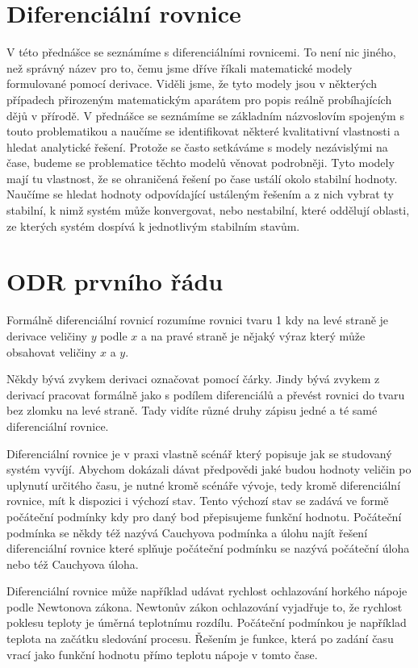 \documentclass[12pt]{article}
\begin{document}
\section*{Diferenciální rovnice}

V této přednášce se seznámíme s diferenciálními rovnicemi. To není nic jiného, než správný název pro to, čemu jsme dříve říkali matematické modely formulované pomocí derivace. Viděli jsme, že tyto modely jsou v některých případech přirozeným matematickým aparátem pro popis reálně probíhajících dějů v přírodě. V přednášce se seznámíme se základním názvoslovím spojeným s touto problematikou a naučíme se identifikovat některé kvalitativní vlastnosti a hledat analytické řešení. Protože se často setkáváme s modely nezávislými na čase, budeme se problematice těchto modelů věnovat podrobněji. Tyto modely mají tu vlastnost, že se ohraničená řešení po čase ustálí okolo stabilní hodnoty. Naučíme se hledat hodnoty odpovídající ustáleným řešením a z nich vybrat ty stabilní, k nimž systém může konvergovat, nebo nestabilní, které oddělují oblasti, ze kterých systém dospívá k jednotlivým stabilním stavům.

\section*{ODR prvního řádu}

Formálně diferenciální rovnicí rozumíme rovnici tvaru 1 kdy na levé straně je derivace veličiny $y$ podle $x$ a na pravé straně je nějaký výraz který může obsahovat veličiny $x$ a $y$. 

Někdy bývá zvykem derivaci označovat pomocí čárky. Jindy bývá zvykem z derivací pracovat formálně jako s podílem diferenciálů a převést rovnici do tvaru bez zlomku na levé straně. Tady vidíte různé druhy zápisu jedné a té samé diferenciální rovnice.

Diferenciální rovnice je v praxi vlastně scénář který popisuje jak se studovaný systém vyvíjí. Abychom dokázali dávat předpovědi jaké budou hodnoty veličin po uplynutí určitého času, je nutné kromě scénáře vývoje, tedy kromě diferenciální rovnice, mít k dispozici i výchozí stav. Tento výchozí stav se zadává ve formě počáteční podmínky kdy pro daný bod přepisujeme funkční hodnotu. Počáteční podmínka se někdy též nazývá Cauchyova podmínka a úlohu najít řešení diferenciální rovnice které splňuje počáteční podmínku se nazývá počáteční úloha nebo též Cauchyova úloha.

Diferenciální rovnice může například udávat rychlost ochlazování horkého nápoje podle Newtonova zákona. Newtonův zákon ochlazování vyjadřuje to, že rychlost poklesu teploty je úměrná teplotnímu rozdílu. Počáteční podmínkou je například teplota na začátku sledování procesu. Řešením je funkce, která po zadání času vrací jako funkční hodnotu přímo teplotu nápoje v tomto čase. 
\end{document}
